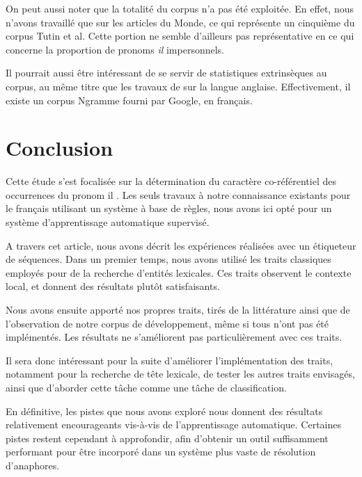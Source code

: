 \documentclass[a4paper,12pt]{article}
\begin{document}
On peut aussi noter que la totalité du corpus n'a pas été exploitée. En effet, nous n'avons travaillé que sur les articles du Monde, ce qui représente un cinquième du corpus Tutin et al. Cette portion ne semble d'ailleurs pas représentative en ce qui concerne la proportion de pronoms \og \textit{il} \fg{} impersonnels. 

Il pourrait aussi être intéressant de se servir de statistiques extrinsèques au corpus, au même titre que les travaux de \citeauthor{Bergsma-11} sur la langue anglaise. Effectivement, il existe un corpus Ngramme fourni par Google, en français.


\section*{Conclusion}

Cette étude s'est focalisée sur la détermination du caractère co-référentiel des occurrences du pronom \og il \fg{}. Les seuls travaux à notre connaissance existants pour le français utilisant un système à base de règles, nous avons ici opté pour un système d'apprentissage automatique supervisé.

A travers cet article, nous avons décrit les expériences réalisées avec un étiqueteur de séquences. Dans un premier temps, nous avons utilisé les traits classiques employés pour de la recherche d'entités lexicales. Ces traits observent le contexte local, et donnent des résultats plutôt satisfaisants.

Nous avons ensuite apporté nos propres traits, tirés de la littérature ainsi que de l'observation de notre corpus de développement, m\^eme si tous n'ont pas été implémentés. Les résultats ne s'améliorent pas particulièrement avec ces traits.

Il sera donc intéressant pour la suite d'améliorer l'implémentation des traits, notamment pour la recherche de tête lexicale, de tester les autres traits envisagés, ainsi que d'aborder cette tâche comme une tâche de classification.

En définitive, les pistes que nous avons exploré nous donnent des résultats relativement encourageants vis-à-vis de l'apprentissage automatique. Certaines pistes restent cependant à approfondir, afin d'obtenir un outil suffisamment performant pour être incorporé dans un système plus vaste de résolution d'anaphores.



\end{document}
